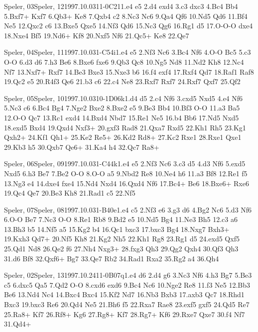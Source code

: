 \documentclass[twocolumn,a4paper,10pt]{report}
\begin{document}
\newpage
\begin{chessgame}{Speler, 03}{Speler, 12}{1997.10.03}{1}{1-0}{C21}{1.e4 e5 2.d4 exd4 3.c3 dxc3 4.Bc4 Bb4 5.Bxf7+ Kxf7 6.Qb3+ Ke8 7.Qxb4 c2 8.Nc3 Nc6 9.Qa4 Qf6 10.Nd5 Qd6 11.Bf4 Ne5 12.Qxc2 c6 13.Bxe5 Qxe5 14.Nf3 Qd6 15.Nc3 Qg6 16.Rg1 d5 17.O-O-O dxe4 18.Nxe4 Bf5 19.Nd6+ Kf8 20.Nxf5 Nf6 21.Qc5+ Ke8 22.Qe7\mate}\end{chessgame}
\begin{chessgame}{Speler, 04}{Speler, 11}{1997.10.03}{1}{\textonehalf-\textonehalf}{C54i}{1.e4 e5 2.Nf3 Nc6 3.Bc4 Nf6 4.O-O Bc5 5.c3 O-O 6.d3 d6 7.h3 Be6 8.Bxe6 fxe6 9.Qb3 Qc8 10.Ng5 Nd8 11.Nd2 Kh8 12.Nc4 Nf7 13.Nxf7+ Rxf7 14.Be3 Bxe3 15.Nxe3 b6 16.f4 exf4 17.Rxf4 Qd7 18.Raf1 Raf8 19.Qc2 e5 20.R4f3 Qe6 21.b3 c6 22.c4 Ne8 23.Rxf7 Rxf7 24.Rxf7 Qxf7 25.Qf2}\end{chessgame}
\begin{chessgame}{Speler, 05}{Speler, 10}{1997.10.03}{1}{0-1}{D06k}{1.d4 d5 2.c4 Nf6 3.cxd5 Nxd5 4.e4 Nf6 5.Nc3 c6 6.Bc4 Bg4 7.Nge2 Bxe2 8.Bxe2 e5 9.Be3 Bb4 10.Bf3 O-O 11.a3 Ba5 12.O-O Qc7 13.Rc1 exd4 14.Bxd4 Nbd7 15.Re1 Ne5 16.b4 Bb6 17.Nd5 Nxd5 18.exd5 Bxd4 19.Qxd4 Nxf3+ 20.gxf3 Rad8 21.Qxa7 Rxd5 22.Kh1 Rh5 23.Kg1 Qxh2+ 24.Kf1 Qh1+ 25.Ke2 Re5+ 26.Kd2 Rd8+ 27.Kc2 Rxe1 28.Rxe1 Qxe1 29.Kb3 h5 30.Qxb7 Qe6+ 31.Ka4 h4 32.Qc7 Ra8+}\end{chessgame}
\begin{chessgame}{Speler, 06}{Speler, 09}{1997.10.03}{1}{\textonehalf-\textonehalf}{C44k}{1.e4 e5 2.Nf3 Nc6 3.c3 d5 4.d3 Nf6 5.exd5 Nxd5 6.h3 Be7 7.Be2 O-O 8.O-O a5 9.Nbd2 Re8 10.Ne4 h6 11.a3 Bf8 12.Re1 f5 13.Ng3 e4 14.dxe4 fxe4 15.Nd4 Nxd4 16.Qxd4 Nf6 17.Bc4+ Be6 18.Bxe6+ Rxe6 19.Qc4 Qe7 20.Be3 Kh8 21.Rad1 c5 22.Nf5}\end{chessgame}
\begin{chessgame}{Speler, 07}{Speler, 08}{1997.10.03}{1}{\textonehalf-\textonehalf}{B40e}{1.e4 c5 2.Nf3 e6 3.g3 d6 4.Bg2 Nc6 5.d3 Nf6 6.O-O Be7 7.Nc3 O-O 8.Re1 Rb8 9.Bd2 e5 10.Nd5 Bg4 11.Ne3 Bh5 12.c3 a6 13.Bh3 b5 14.Nf5 a5 15.Kg2 b4 16.Qc1 bxc3 17.bxc3 Bg4 18.Nxg7 Bxh3+ 19.Kxh3 Qd7+ 20.Nf5 Kh8 21.Kg2 Nh5 22.Kh1 Rg8 23.Rg1 d5 24.exd5 Qxf5 25.Qd1 Nd8 26.Qe2 f6 27.Nh4 Nxg3+ 28.fxg3 Qh3 29.Qg2 Qxh4 30.Qf3 Qh3 31.d6 Bf8 32.Qxf6+ Bg7 33.Qe7 Rb2 34.Rad1 Rxa2 35.Rg2 a4 36.Qh4}\end{chessgame}
\begin{chessgame}{Speler, 02}{Speler, 13}{1997.10.24}{1}{1-0}{B07q}{1.e4 d6 2.d4 g6 3.Nc3 Nf6 4.h3 Bg7 5.Be3 c5 6.dxc5 Qa5 7.Qd2 O-O 8.cxd6 exd6 9.Bc4 Nc6 10.Nge2 Re8 11.f3 Ne5 12.Bb3 Be6 13.Nd4 Nc4 14.Bxc4 Bxc4 15.Kf2 Nd7 16.Nb3 Bxb3 17.axb3 Qc7 18.Rhd1 Bxc3 19.bxc3 Re6 20.Qd4 Ne5 21.Bh6 f5 22.Rxa7 Rae8 23.exf5 gxf5 24.Qd5 Re7 25.Ra8+ Kf7 26.Rf8+ Kg6 27.Rg8+ Kf7 28.Rg7+ Kf6 29.Rxe7 Qxe7 30.f4 Nf7 31.Qd4+}\end{chessgame}
\end{document}
